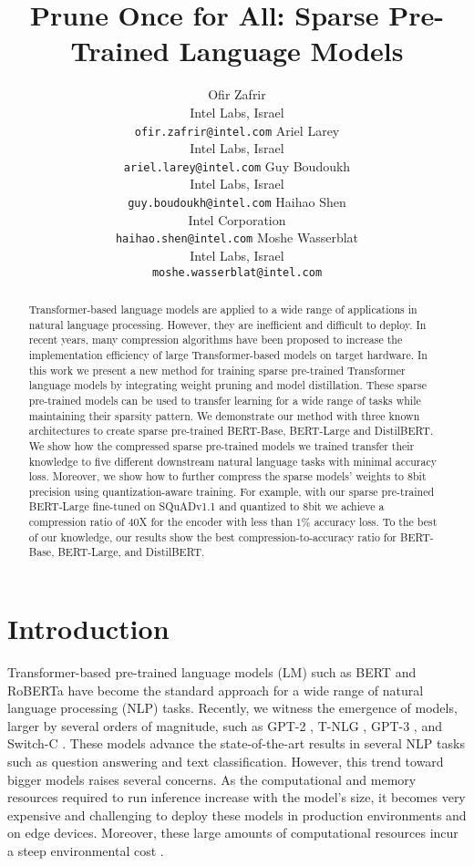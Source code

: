 \documentclass{article}
\title{Prune Once for All: Sparse Pre-Trained Language Models}
\author{
  Ofir Zafrir \\
  Intel Labs, Israel \\
  \texttt{ofir.zafrir@intel.com}
  \And
  Ariel Larey \\
  Intel Labs, Israel \\
  \texttt{ariel.larey@intel.com}
  \And
  Guy Boudoukh \\
  Intel Labs, Israel \\
  \texttt{guy.boudoukh@intel.com}
  \And
  Haihao Shen \\
  Intel Corporation \\
  \texttt{haihao.shen@intel.com}
  \And
  Moshe Wasserblat \\
  Intel Labs, Israel \\
  \texttt{moshe.wasserblat@intel.com}
}
\begin{document}
\maketitle

\begin{abstract}
Transformer-based language models are applied to a wide range of applications in natural language processing.
However, they are inefficient and difficult to deploy.
In recent years, many compression algorithms have been proposed to increase the implementation efficiency of large Transformer-based models on target hardware.
In this work we present a new method for training sparse pre-trained Transformer language models by integrating weight pruning and model distillation.
These sparse pre-trained models can be used to transfer learning for a wide range of tasks while maintaining their sparsity pattern. 
We demonstrate our method with three known architectures to create sparse pre-trained BERT-Base, BERT-Large and DistilBERT.
We show how the compressed sparse pre-trained models we trained transfer their knowledge to five different downstream natural language tasks with minimal accuracy loss.
Moreover, we show how to further compress the sparse models' weights to 8bit precision using quantization-aware training.
For example, with our sparse pre-trained BERT-Large fine-tuned on SQuADv1.1 and quantized to 8bit we achieve a compression ratio of $40$X for the encoder with less than $1\%$ accuracy loss.
To the best of our knowledge, our results show the best compression-to-accuracy ratio for BERT-Base, BERT-Large, and DistilBERT.
\end{abstract}

\section{Introduction}
\label{sec:intro}
Transformer-based pre-trained language models (LM) such as BERT \citep{devlin2018bert} and RoBERTa \citep{liu2019roberta} have become the standard approach for a wide range of natural language processing (NLP) tasks.
Recently, we witness the emergence of models, larger by several orders of magnitude, such as GPT-2 \citep{radford2019gpt2}, T-NLG \citep{rosset2020tnlg}, GPT-3 \citep{brown2020gpt3}, and Switch-C \citep{fedus2021switch}. 
These models advance the state-of-the-art results in several NLP tasks such as question answering and text classification.
However, this trend toward bigger models raises several concerns.
As the computational and memory resources required to run inference increase with the model's size, it becomes very expensive and challenging to deploy these models in production environments and on edge devices.
Moreover, these large amounts of computational resources incur a steep environmental cost \citep{strubell2019green}.
\end{document}
